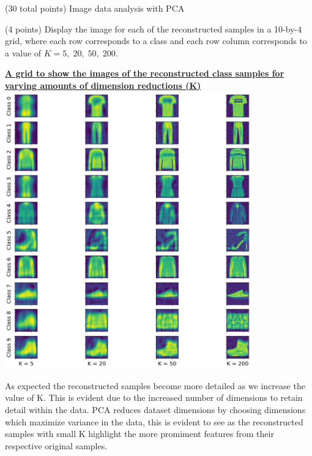 \documentclass[12pt]{article}
\begin{document}
\begin{question}{(30 total points) Image data analysis with PCA}
\begin{subquestion}
   \end{subquestion}
   
   \begin{subquestion}{(4 points)
       Display the image for each of the reconstructed samples in
       a 10-by-4 grid, where each row corresponds to a class and
       each row column corresponds to a value of $K=5, \; 20, \; 50, \; 200$.
     } \label{Q1.7}


   

      \begin{answerbox}{52em}
        \begin{center}
        \textbf{\underline{A grid to show the images of the reconstructed class samples for}}\\
        \textbf{\underline{varying amounts of dimension reductions (K)}}
        \vspace{0.3cm}\\
         \includegraphics[width=0.8\textwidth]{images/q17.png}
        \end{center}
        \footnotesize{
        As expected the reconstructed samples become more detailed as we increase the value of K. This is evident due to the increased number of dimensions to retain detail within the data. PCA reduces dataset dimensions by choosing dimensions which maximize variance in the data, this is evident to see as the reconstructed samples with small K highlight the more promiment features from their respective original samples.}
      \end{answerbox}
  



\end{subquestion}
\end{question}
\end{document}
